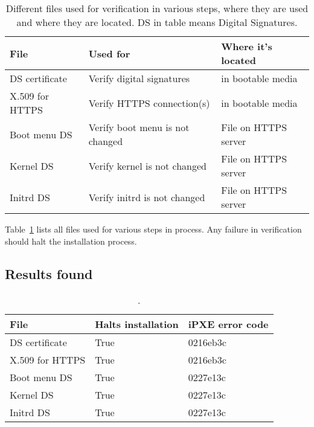 \begin{table}[!ht]
  \def\arraystretch{1.1}%
  \begin{center}
    \begin{tabular}{| l | l | l |}
      \hline
      File            & Used for                        & Where it's located   \\
      \hline
      DS certificate  & Verify digital signatures       & in bootable media    \\
      X.509 for HTTPS & Verify HTTPS connection(s)      & in bootable media    \\
      Boot menu DS    & Verify boot menu is not changed & File on HTTPS server \\
      Kernel DS       & Verify kernel is not changed    & File on HTTPS server \\
      Initrd DS       & Verify initrd is not changed    & File on HTTPS server \\
      \hline
    \end{tabular}
    \caption{Different files used for verification in various steps,
      where they are used and where they are located. DS in table
      means Digital Signatures.\label{tab:verification_files}}
  \end{center}
\end{table}

Table~\ref{tab:verification_files} lists all files used for various
steps in process. Any failure in verification should halt the installation process.


\subsection{Results found}

\begin{table}[!ht]
  \def\arraystretch{1.1}%
  \begin{center}
    \begin{tabular}{| l | l | l |}
      \hline
      File            & Halts installation & iPXE error code \\
      \hline
      DS certificate  & True               & 0216eb3c        \\
      X.509 for HTTPS & True               & 0216eb3c        \\
      Boot menu DS    & True               & 0227e13c        \\
      Kernel DS       & True               & 0227e13c        \\
      Initrd DS       & True               & 0227e13c        \\
      \hline
    \end{tabular}
    \caption{.\label{tab:mechanical_check_results}}
  \end{center}
\end{table}

